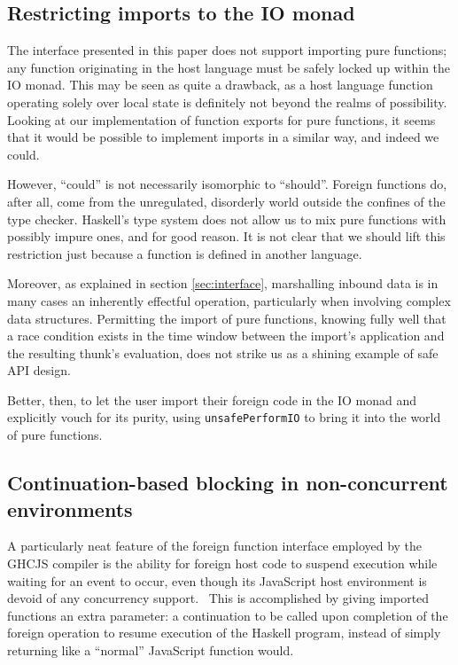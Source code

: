 \documentclass[preprint]{sigplanconf}
\begin{document}
\subsection{Restricting imports to the IO monad}
The interface presented in this paper does not support importing pure
functions; any function originating in the host language must be safely locked
up within the IO monad. This may be seen as quite a drawback, as a host
language function operating solely over local state is definitely not
beyond the realms of possibility. Looking at our implementation of function
exports for pure functions, it seems that it would be possible to implement
imports in a similar way, and indeed we could.

However, ``could'' is not necessarily isomorphic to ``should''.
Foreign functions do, after all, come from the unregulated, disorderly world
outside the confines of the type checker. Haskell's type system does not
allow us to mix pure functions with possibly impure ones, and for good
reason. It is not clear that we should lift this
restriction just because a function is defined in another language.

Moreover, as explained in section \ref{sec:interface}, marshalling inbound
data is in many cases an inherently effectful operation, particularly when
involving complex data structures. Permitting the import of pure functions,
knowing fully well that a race condition exists in the time window between
the import's application and the resulting thunk's evaluation, does not strike
us as a shining example of safe API design.

Better, then, to let the user import their foreign code in the IO monad and
explicitly vouch for its purity, using \lstinline!unsafePerformIO! to bring it
into the world of pure functions.

\subsection{Continuation-based blocking in non-concurrent environments}
A particularly neat feature of the foreign function interface employed by the
GHCJS compiler is the ability for foreign host code to suspend execution while
waiting for an event to occur, even though its JavaScript host environment is
devoid of any concurrency support.\ \cite{ghcjs}
This is accomplished by giving imported functions an extra parameter:
a continuation to be called upon completion
of the foreign operation to resume execution of the Haskell program, instead
of simply returning like a ``normal'' JavaScript function would.
\end{document}
